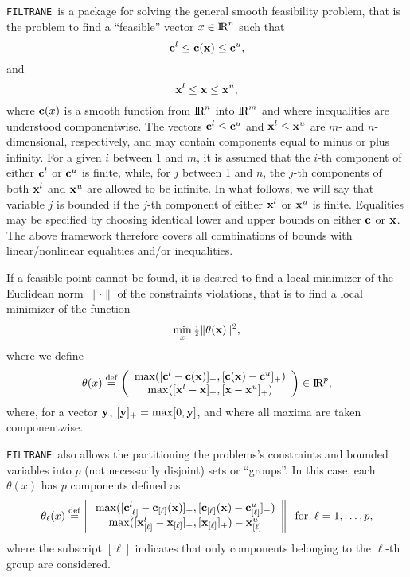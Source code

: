 \documentclass{galahad}
\newcommand{\packagename}{FILTRANE}
\newcommand{\filtrane}{{\tt \packagename}}
\renewcommand{\Re}{\hbox{I\hskip -1.5pt R}}
\begin{document}
\galheader


\galsummary

\filtrane\ is a package for solving the general smooth feasibility
problem, that is the problem to find a ``feasible'' vector $x \in \Re^n$ such
that 
\[
{\mathbf{c}}^l \leq {\mathbf{c}}({\mathbf{x}}) \leq {\mathbf{c}}^u,
\]
and
\[
{\mathbf{x}}^l \leq {\mathbf{x}} \leq {\mathbf{x}}^u,
\]
where ${\mathbf{c}}(x)$ is a smooth function from $\Re^n$ into
$\Re^m$ and where inequalities are understood componentwise.
The vectors ${\mathbf{c}}^l \leq {\mathbf{c}}^u$ and ${\mathbf{x}}^l \leq {\mathbf{x}}^u$ are $m$- and
$n$-dimensional, respectively, and may contain components equal to minus or
plus infinity. For a given $i$ between 1 and $m$, it is assumed that the
$i$-th component of either ${\mathbf{c}}^l$ or ${\mathbf{c}}^u$ is finite, while, for $j$
between 1 and $n$, the $j$-th components of both ${\mathbf{x}}^l$ and ${\mathbf{x}}^u$ are
allowed to be infinite.  In what follows, we will say that variable $j$ is
bounded if the $j$-th component of either ${\mathbf{x}}^l$ or ${\mathbf{x}}^u$ is
finite. Equalities may be specified by choosing identical lower and upper
bounds on either ${\mathbf{c}}$ or ${\mathbf{x}}$. The above framework therefore covers all
combinations of bounds with linear/nonlinear equalities and/or inequalities.

If a feasible point cannot be found, it is desired to find a local minimizer
of the Euclidean norm $\|\cdot\|$ of the constraints violations, that is to
find a local minimizer of the function
\begin{equation}\label{thetadef}
\min_x {\scriptstyle \frac{1}{2}} \| \theta({\mathbf{x}}) \|^2,
\end{equation}
where we define
\[
\theta(x) \eqdef \left( \begin{array}{c}
                 \max( [\bmc^l - \bmc(\bmx)]_+, [ \bmc( \bmx ) - \bmc^u ]_+ ) \\
                 \max( [\bmx^l - \bmx]_+, [ \bmx - \bmx^u ]_+ )
                 \end{array} \right) \in \Re^p,
\]
where, for a vector ${\mathbf{y}}$, $[{\mathbf{y}}]_+ = \max[0,{\mathbf{y}}]$, and where all maxima
are taken componentwise.

\filtrane\ also allows the partitioning the problems's constraints and bounded
variables into $p$ (not necessarily disjoint) sets or ``groups''.
In this case, each $\theta(x)$ has $p$ components defined as
\[
\theta_{\ell}(x) \stackrel{\rm def}{=} 
\left\| \begin{array}{c}
    \max( [ {\mathbf{c}}^l_{[\ell]} - {\mathbf{c}}_{[\ell]}( {\mathbf{x}} )]_+,
          [ {\mathbf{c}}_{[\ell]}( {\mathbf{x}} ) - {\mathbf{c}}^u_{[\ell]} ]_+ ) \\
    \max( [ {\mathbf{x}}^l_{[\ell]} - {\mathbf{x}}_{[\ell]}]_+,
          [ {\mathbf{x}}_{[\ell]} ]_+ ) - {\mathbf{x}}^u_{[\ell]} \\
        \end{array} \right\|
\;\; \mbox{for} \;\; \ell = 1, \ldots, p, 
\]
where the subscript $[\ell]$ indicates that only components belonging to
the $\ell$-th group are considered.
\end{document}
